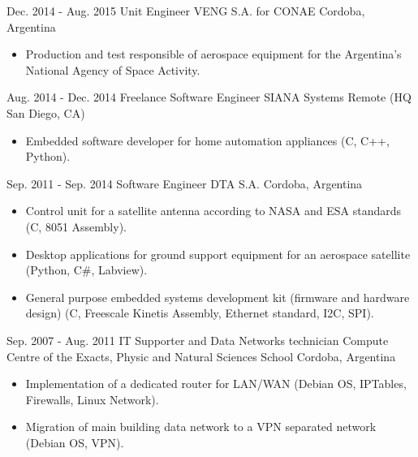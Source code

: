   \cventry
    {Dec. 2014 - Aug. 2015} %
    {Unit Engineer} %
    {VENG S.A. for CONAE} %
    {Cordoba, Argentina} %
    {}
    {
      \begin{itemize} %
        \item {Production and test responsible of aerospace equipment for the Argentina's National Agency of Space Activity.}
      \end{itemize}
    }

  \cventry
    {Aug. 2014 - Dec. 2014} %
    {Freelance Software Engineer} %
    {SIANA Systems} %
    {Remote (HQ San Diego, CA)} %
    {}
    {
      \begin{itemize} %
        \item {Embedded software developer for home automation appliances (C, C++, Python).}
      \end{itemize}
    }

  \cventry
    {Sep. 2011 - Sep. 2014} %
    {Software Engineer} %
    {DTA S.A.} %
    {Cordoba, Argentina} %
    {}
    {
      \begin{itemize} %
        \item {Control unit for a satellite antenna according to NASA and ESA standards (C, 8051 Assembly).}
        \item {Desktop applications for ground support equipment for an aerospace satellite (Python, C\#, Labview).}
        \item {General purpose embedded systems development kit (firmware and hardware design) (C, Freescale Kinetis Assembly, Ethernet standard, I2C, SPI).}
      \end{itemize}
    }

  \cventry
    {Sep. 2007 - Aug. 2011} %
    {IT Supporter and Data Networks technician} %
    {Compute Centre of the Exacts, Physic and Natural Sciences School} %
    {Cordoba, Argentina} %
    {}
    {
      \begin{itemize} %
        \item {Implementation of a dedicated router for LAN/WAN (Debian OS, IPTables, Firewalls, Linux Network).}
        \item {Migration of main building data network to a VPN separated network (Debian OS, VPN).}
      \end{itemize}
    }

